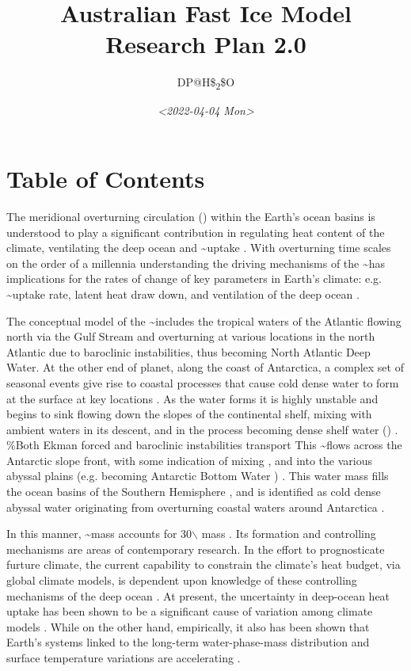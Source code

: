 \documentclass[a4paper]{article}
\affiliation{<Your school, think tank, etc>}
\author{DP@H\$\textsubscript{2}\$O}
\date{\textit{<2022-04-04 Mon>}}
\title{Australian Fast Ice Model\\\medskip
\large Research Plan 2.0}
\begin{document}
\maketitle
\tableofcontents



\section{Table of Contents}
\label{sec:org76dc7db}
The meridional overturning circulation (\moc) within the Earth's ocean basins is understood to play a significant contribution in regulating heat content of the climate, ventilating the deep ocean and \cotwo\textasciitilde{}uptake \citep{Orsi1999,Levitus2005,Bindoff2007,Purkey2010,Talley2013}. With overturning
time scales on the order of a millennia \citep{Johnson2008} understanding the
driving mechanisms of the \moc\textasciitilde{}has implications for the rates of change of key
parameters in Earth's climate: e.g. \cotwo\textasciitilde{}uptake rate, latent heat draw down,
and ventilation of the deep ocean \citep{Bindoff2007,Purkey2010}.

The conceptual model of the \moc\textasciitilde{}includes the tropical waters of the Atlantic flowing north via the Gulf Stream
and overturning at various locations in the north Atlantic due to baroclinic
instabilities, thus becoming North Atlantic Deep Water. At the other
end of planet, along the coast of Antarctica, a complex set
of seasonal events give rise to coastal processes that cause cold dense water
to form at the surface at key locations \citep{Orsi1999,Talley2013}. As the water
forms it is highly unstable and begins to sink flowing down the slopes of the
continental shelf, mixing with ambient waters in its descent, and in the process
becoming dense shelf water (\dsw) \citep{Orsi2001}.
\%Both Ekman forced and baroclinic instabilities transport \citep{Rintoul2018}
This \dsw\textasciitilde{}flows across the Antarctic slope front, with some indication of mixing \citep{Mizuta2021,VanAchter2021,Rintoul2018}, and into the various abyssal plains (e.g. becoming Antarctic Bottom Water \textemdash \aabw)
\citep{Stewart2019}. This water mass fills the ocean basins of the Southern Hemisphere \citep{Johnson2008}, and is
identified as cold dense abyssal water originating from overturning coastal
waters around Antarctica \citep{Orsi1999}.

In this manner, \aabw\textasciitilde{}mass accounts for 30$\backslash$%
mass \citep{Johnson2008}. Its formation and controlling mechanisms are areas of contemporary research. In the effort to prognosticate furture climate, the current capability to constrain the climate's heat budget,
via global climate models, is dependent upon knowledge of these
controlling mechanisms of the deep ocean
\citep{Domingues2008,Murphy2009,Purkey2012,Durack2018}. At present, the
uncertainty in deep-ocean heat uptake has been shown to be a significant cause
of variation among climate models \citep{Boe2009,Durack2018}. While on the other hand, empirically, it also has been
shown that Earth's systems linked to the long-term water-phase-mass distribution
and surface temperature variations are accelerating
\citep{Murphy2009,IPCC2019SpecialReport}.
\end{document}
